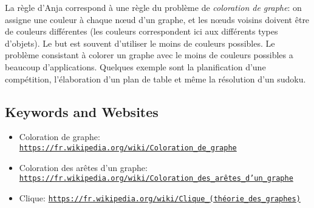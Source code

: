 \documentclass[a4paper,11pt]{report}
\newcommand{\BrochureUrlText}[1]{\texttt{#1}}
\begin{document}
La règle d’Anja correspond à une règle du problème de \emph{coloration de graphe}: on assigne une couleur à chaque nœud d’un graphe, et les nœuds voisins doivent être de couleurs différentes (les couleurs correspondent ici aux différents types d’objets). Le but est souvent d’utiliser le moins de couleurs possibles. Le problème consistant à colorer un graphe avec le moins de couleurs possibles a beaucoup d’applications. Quelques exemple sont la planification d’une compétition, l’élaboration d’un plan de table et même la résolution d’un sudoku.

{\raggedright

\subsection*{Keywords and Websites}

\begin{itemize}
  \item Coloration de graphe: \href{https://fr.wikipedia.org/wiki/Coloration_de_graphe}{\BrochureUrlText{https://fr.wikipedia.org/wiki/Coloration\_de\_graphe}}
  \item Coloration des arêtes d’un graphe: \href{https://fr.wikipedia.org/wiki/Coloration_des_ar\%C3\%AAtes_d\%27un_graphe}{\BrochureUrlText{https://fr.wikipedia.org/wiki/Coloration\_des\_arêtes\_d’un\_graphe}}
  \item Clique: \href{https://fr.wikipedia.org/wiki/Clique_(th\%C3\%A9orie_des_graphes)}{\BrochureUrlText{https://fr.wikipedia.org/wiki/Clique\_(théorie\_des\_graphes)}}
\end{itemize}


}
\end{document}
